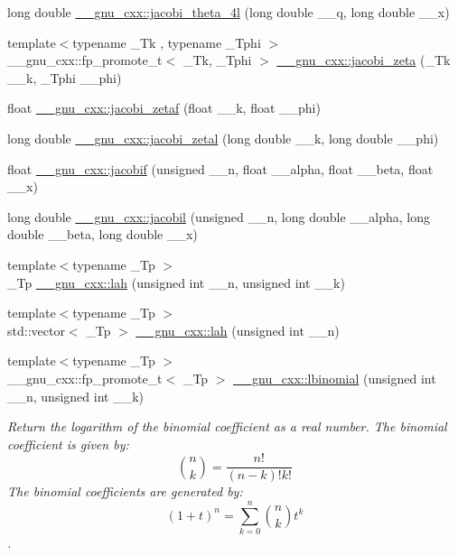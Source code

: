 \begin{DoxyCompactItemize}
\item 
long double \hyperlink{group__mathsf__gnu_ga7c2a13198bdfd3f8cf1bc1758b1f56be}{\+\_\+\+\_\+gnu\+\_\+cxx\+::jacobi\+\_\+theta\+\_\+4l} (long double \+\_\+\+\_\+q, long double \+\_\+\+\_\+x)
\item 
{\footnotesize template$<$typename \+\_\+\+Tk , typename \+\_\+\+Tphi $>$ }\\\+\_\+\+\_\+gnu\+\_\+cxx\+::fp\+\_\+promote\+\_\+t$<$ \+\_\+\+Tk, \+\_\+\+Tphi $>$ \hyperlink{group__mathsf__gnu_ga639be4ebef9a20572375ec534be52b07}{\+\_\+\+\_\+gnu\+\_\+cxx\+::jacobi\+\_\+zeta} (\+\_\+\+Tk \+\_\+\+\_\+k, \+\_\+\+Tphi \+\_\+\+\_\+phi)
\item 
float \hyperlink{group__mathsf__gnu_gaedb6b352331c67b9dea73660e2045668}{\+\_\+\+\_\+gnu\+\_\+cxx\+::jacobi\+\_\+zetaf} (float \+\_\+\+\_\+k, float \+\_\+\+\_\+phi)
\item 
long double \hyperlink{group__mathsf__gnu_ga9db158df9459aa12c840724338753913}{\+\_\+\+\_\+gnu\+\_\+cxx\+::jacobi\+\_\+zetal} (long double \+\_\+\+\_\+k, long double \+\_\+\+\_\+phi)
\item 
float \hyperlink{group__mathsf__gnu_ga450db12e06d6993d169afab5b3f6d0b8}{\+\_\+\+\_\+gnu\+\_\+cxx\+::jacobif} (unsigned \+\_\+\+\_\+n, float \+\_\+\+\_\+alpha, float \+\_\+\+\_\+beta, float \+\_\+\+\_\+x)
\item 
long double \hyperlink{group__mathsf__gnu_ga2898a5ebf451eaf259ecfcdd171aa72b}{\+\_\+\+\_\+gnu\+\_\+cxx\+::jacobil} (unsigned \+\_\+\+\_\+n, long double \+\_\+\+\_\+alpha, long double \+\_\+\+\_\+beta, long double \+\_\+\+\_\+x)
\item 
{\footnotesize template$<$typename \+\_\+\+Tp $>$ }\\\+\_\+\+Tp \hyperlink{group__mathsf__gnu_gaa3491fabb0a6ef54a946a7a23ca866c7}{\+\_\+\+\_\+gnu\+\_\+cxx\+::lah} (unsigned int \+\_\+\+\_\+n, unsigned int \+\_\+\+\_\+k)
\item 
{\footnotesize template$<$typename \+\_\+\+Tp $>$ }\\std\+::vector$<$ \+\_\+\+Tp $>$ \hyperlink{group__mathsf__gnu_ga161fe80a0d88f67a5a16ef2dcc3d4645}{\+\_\+\+\_\+gnu\+\_\+cxx\+::lah} (unsigned int \+\_\+\+\_\+n)
\item 
{\footnotesize template$<$typename \+\_\+\+Tp $>$ }\\\+\_\+\+\_\+gnu\+\_\+cxx\+::fp\+\_\+promote\+\_\+t$<$ \+\_\+\+Tp $>$ \hyperlink{group__mathsf__gnu_gabfa5aeba56edfa110846fc8e76963bc2}{\+\_\+\+\_\+gnu\+\_\+cxx\+::lbinomial} (unsigned int \+\_\+\+\_\+n, unsigned int \+\_\+\+\_\+k)
\begin{DoxyCompactList}\small\item\em Return the logarithm of the binomial coefficient as a real number. The binomial coefficient is given by\+: \[ \binom{n}{k} = \frac{n!}{(n-k)! k!} \] The binomial coefficients are generated by\+: \[ \left(1 + t\right)^n = \sum_{k=0}^n \binom{n}{k} t^k \]. \end{DoxyCompactList}\item 

\end{DoxyCompactItemize}
